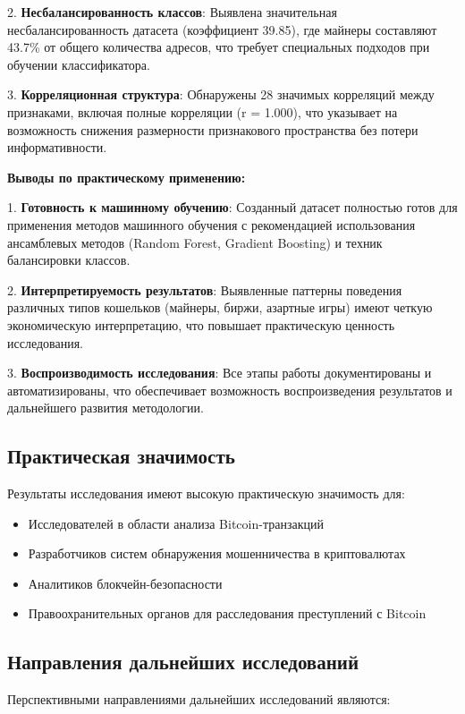 2. \textbf{Несбалансированность классов}: Выявлена значительная несбалансированность датасета (коэффициент 39.85), где майнеры составляют 43.7\% от общего количества адресов, что требует специальных подходов при обучении классификатора.

3. \textbf{Корреляционная структура}: Обнаружены 28 значимых корреляций между признаками, включая полные корреляции (r = 1.000), что указывает на возможность снижения размерности признакового пространства без потери информативности.

\textbf{Выводы по практическому применению:}

1. \textbf{Готовность к машинному обучению}: Созданный датасет полностью готов для применения методов машинного обучения с рекомендацией использования ансамблевых методов (Random Forest, Gradient Boosting) и техник балансировки классов.

2. \textbf{Интерпретируемость результатов}: Выявленные паттерны поведения различных типов кошельков (майнеры, биржи, азартные игры) имеют четкую экономическую интерпретацию, что повышает практическую ценность исследования.

3. \textbf{Воспроизводимость исследования}: Все этапы работы документированы и автоматизированы, что обеспечивает возможность воспроизведения результатов и дальнейшего развития методологии.

\subsection{Практическая значимость}

Результаты исследования имеют высокую практическую значимость для:

\begin{itemize}
    \item Исследователей в области анализа Bitcoin-транзакций
    \item Разработчиков систем обнаружения мошенничества в криптовалютах
    \item Аналитиков блокчейн-безопасности
    \item Правоохранительных органов для расследования преступлений с Bitcoin
\end{itemize}

\subsection{Направления дальнейших исследований}

Перспективными направлениями дальнейших исследований являются:

